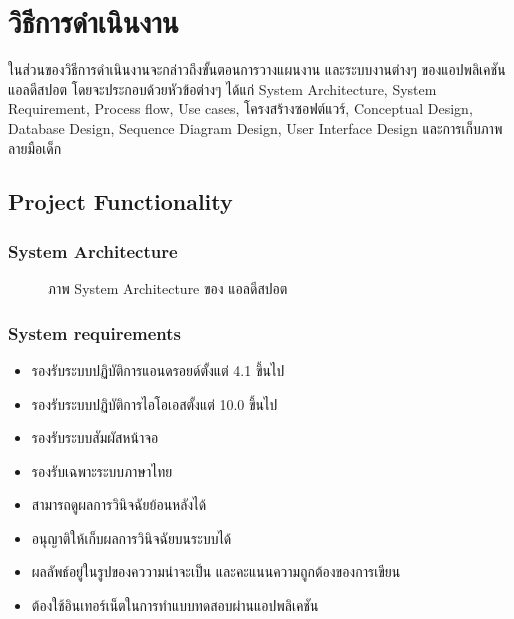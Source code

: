 \documentclass[12pt,oneside,openright,a4paper]{cpe-thai-project}
\begin{document}
\chapter{วิธีการดำเนินงาน}
ในส่วนของวิธีการดำเนินงานจะกล่าวถึงขั้นตอนการวางแผนงาน และระบบงานต่างๆ ของแอปพลิเคชัน แอลดีสปอต โดยจะประกอบด้วยหัวข้อต่างๆ ได้แก่ System Architecture, System Requirement, Process flow, Use cases, โครงสร้างซอฟต์แวร์, Conceptual Design, Database Design, Sequence Diagram Design, User Interface Design และการเก็บภาพลายมือเด็ก
\section{Project Functionality}
\subsection{System Architecture}
\begin{figure}[!ht]\centering
  \setlength{\fboxrule}{0.2mm} %
  \setlength{\fboxsep}{1cm}
  \caption{ภาพ System Architecture ของ แอลดีสปอต}\label{fig:system}
\end{figure}
\subsection{System requirements}
\begin{itemize}
  \item รองรับระบบปฏิบัติการแอนดรอยด์ตั้งแต่ 4.1 ขึ้นไป
  \item รองรับระบบปฏิบัติการไอโอเอสตั้งแต่ 10.0 ขึ้นไป
  \item รองรับระบบสัมผัสหน้าจอ
  \item รองรับเฉพาะระบบภาษาไทย
  \item สามารถดูผลการวินิจฉัยย้อนหลังได้
  \item อนุญาติให้เก็บผลการวินิจฉัยบนระบบได้
  \item ผลลัพธ์อยู่ในรูปของคววามน่าจะเป็น และคะแนนความถูกต้องของการเขียน
  \item ต้องใช้อินเทอร์เน็ตในการทำแบบทดสอบผ่านแอปพลิเคชัน
\end{itemize}
\newpage
\end{document}
